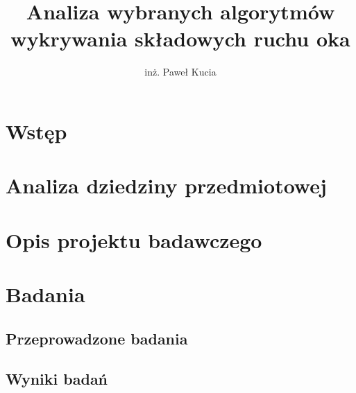\documentclass[14pt,a4paper,twoside,openright,titlepage]{extbook}
\title{Analiza wybranych algorytmów wykrywania składowych ruchu oka}
\author{inż. Paweł Kucia}
\begin{document}
        
        \cleardoublepage
        
        \cleardoublepage
    \restoregeometry
    
    \mainmatter
    \linespread{1.0}\tableofcontents
    \let\cleardoublepage\clearpage
    \pagestyle{fancy}
    \fancyhf{}
    \fancyhead[EL,OR]{\thepage}
    \fancyhead[ER]{\textit{ \nouppercase{\leftmark}}}
    \fancyhead[LO]{\textit{ \nouppercase{\rightmark}}}
    \renewcommand{\headrulewidth}{0.4pt}

    \chapter{Wstęp}
        
    \chapter{Analiza dziedziny przedmiotowej}
        
    \chapter{Opis projektu badawczego}
        
    \chapter{Badania}
        \blindtext
        \section{Przeprowadzone badania}
        \section{Wyniki badań}
\end{document}
